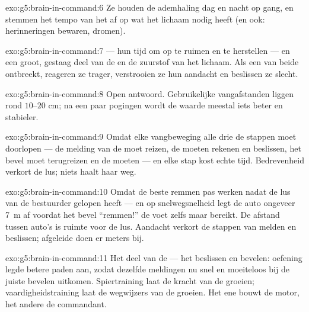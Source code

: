 \begin{solution}{exo:g5:brain-in-command:6}
Ze houden de ademhaling dag en nacht op gang, en stemmen het tempo van
het  af op wat het lichaam nodig heeft (en ook: herinneringen
bewaren, dromen).
\end{solution}

\begin{solution}{exo:g5:brain-in-command:7}
 --- hun tijd om op te ruimen en te herstellen --- en een groot,
gestaag deel van de  en de zuurstof van het lichaam. Als een van
beide ontbreekt, reageren ze trager, verstrooien ze hun aandacht en
beslissen ze slecht.
\end{solution}

\begin{solution}{exo:g5:brain-in-command:8}
Open antwoord. Gebruikelijke vangafstanden liggen rond $10$--$20$ cm;
na een paar pogingen wordt de waarde meestal iets beter en stabieler.
\end{solution}

\begin{solution}{exo:g5:brain-in-command:9}
Omdat elke vangbeweging alle drie de stappen moet doorlopen --- de
melding van de  moet reizen, de  moeten rekenen en
beslissen, het bevel moet terugreizen en de  moeten 
--- en elke stap kost echte tijd. Bedrevenheid verkort de lus; niets
haalt haar weg.
\end{solution}

\begin{solution}{exo:g5:brain-in-command:10}
Omdat de beste remmen pas werken nadat de lus van de bestuurder gelopen
heeft --- en op snelwegsnelheid legt de auto ongeveer \qty{7}{m} af
voordat het bevel ``remmen!'' de voet zelfs maar bereikt. De afstand
tussen auto's is ruimte voor de lus. Aandacht verkort de stappen van
melden en beslissen; afgeleide  doen er meters bij.
\end{solution}

\begin{solution}{exo:g5:brain-in-command:11}
Het deel van de  --- het beslissen en bevelen: oefening legde
betere paden aan, zodat dezelfde meldingen nu snel en moeiteloos bij de
juiste bevelen uitkomen. Spiertraining laat de kracht van de 
groeien; vaardigheidstraining laat de wegwijzers van de  groeien.
Het ene bouwt de motor, het andere de commandant.
\end{solution}
